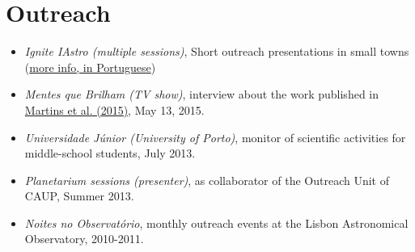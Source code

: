\documentclass[10pt]{article}
\renewcommand{\labelenumi}{-\label{A\theenumi}}
\begin{document}
\ifoutreach

\section{Outreach}
\begin{itemize}
\item \emph{Ignite IAstro (multiple sessions)}, Short outreach presentations in small towns %
      (\href{http://www.iastro.pt/outreach/activities/ignite/}{more info, in Portuguese})\\[-1.5em]
\item \emph{Mentes que Brilham (TV show)}, interview about the work published in \href{http://adsabs.harvard.edu/cgi-bin/nph-abs_connect?fforward=http://dx.doi.org/10.1051/0004-6361/201425298}{Martins et al. (2015)}, May 13, 2015. \\[-1.5em]
\item \emph{Universidade Júnior (University of Porto)}, monitor of scientific activities for middle-school students, July 2013. \\[-1.5em]
\item \emph{Planetarium sessions (presenter)}, as collaborator of the Outreach Unit of CAUP, Summer 2013. \\[-1.5em]
\item \emph{Noites no Observatório}, monthly outreach events at the Lisbon Astronomical Observatory, 2010-2011.
\end{itemize}

\fi



\ifskills
\end{document}
